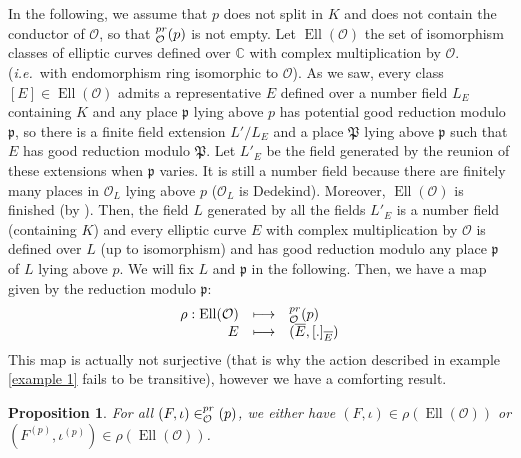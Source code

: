 \documentclass[a4paper,10pt]{report}
\theoremstyle{definition}
\theoremstyle{plain}
\newtheorem{proposition}[definition]{Proposition}
\theoremstyle{definition}
\newcommand{\ie}{\emph{i.e.}\ }
\newcommand{\C}{\mathbb{C}}
\newcommand{\mO}{\mathcal{O}}
\renewcommand{\(}{\left(}
\renewcommand{\)}{\right)}
\newcommand{\mf}[1]{\mathfrak{#1}}
\newcommand{\mfp}{\mathfrak{p}}
\let\SS\relax
\DeclareMathOperator{\SS}{SS}
\DeclareMathOperator{\Ell}{Ell}
\begin{document}
In the following, we assume that $p$ does not split in $K$ and does not contain the conductor of $\mO$, so that $\SS_\mO^{pr}(p)$ is not empty.  Let $\Ell(\mO)$ the set of isomorphism classes of elliptic curves defined over $\C$ with complex multiplication by $\mO$. (\ie  with endomorphism ring isomorphic to $ \mO$). As we saw, every class $[E]\in\Ell(\mO)$ admits a representative $E$ defined over a number field $L_E$ containing $K$ and any place $\mfp$ lying above $p$ has potential good reduction modulo $\mfp$, so there is a finite field extension $L'/L_E$ and a place $\mf{P}$ lying above $\mfp$ such that $E$ has good reduction modulo $\mf{P}$. Let $L'_E$ be the field generated by the reunion of these extensions when $\mfp$ varies.  It is still a number field because there are finitely many places in $\mO_L$ lying above $p$ ($\mO_L$ is Dedekind).  Moreover,  $\Ell(\mO)$ is finished (by \cite[proposition II.2.1.(b)]{Silverman2}). Then, the field $L$ generated by all the fields $L'_E$ is a number field (containing $K$) and every elliptic curve $E$ with complex multiplication by $\mO$ is defined over $L$ (up to isomorphism) and has good reduction modulo any place $\mfp$ of $L$ lying above $p$.  We will fix $L$ and $\mfp$ in the following.  Then, we have a map given by the reduction modulo $\mfp$:
\[\begin{array}{rcl} \rho : \Ell(\mO)& \longmapsto& \SS_\mO^{pr}(p)\\ 
E&\longmapsto&(\overline{E},[.]_{\overline{E}})
\end{array}\]
This map is actually not surjective (that is why the action described in example \ref{example 1} fails to be transitive), however we have a comforting result.

\begin{proposition}\label{proposition 6}
For all $(F,\iota)\in\SS_\mO^{pr}(p)$, we either have $(F,\iota)\in\rho(\Ell(\mO))$ or $(F^{(p)},\iota^{(p)})\in\rho(\Ell(\mO))$.
\end{proposition}
\end{document}

